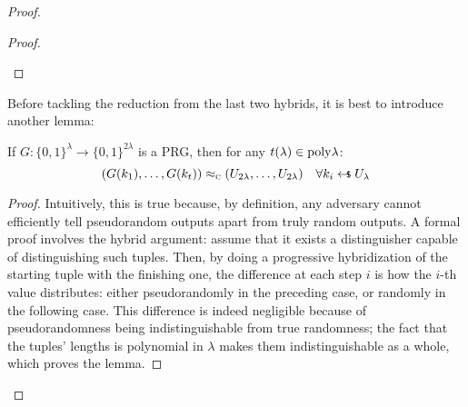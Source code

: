 \begin{proof}
\begin{proof}
\begin{cryptoredux}






        \end{cryptoredux}

    \end{proof}

    Before tackling the reduction from the last two hybrids, it is best to introduce another lemma:


    \begin{lemma}
        If $G : \{0, 1\}^\lambda \to \{0, 1\}^{2\lambda}$ is a PRG, then for any $t(\lambda) \in \mathrm{poly}{\lambda}$:
        \[
            (G(k_1), \dots , G(k_t)) \compindist (U_{2\lambda}, \dots , U_{2\lambda}) \quad \forall k_i \pickUAR U_\lambda
        \]
    \end{lemma}

    \begin{proof}
        Intuitively, this is true because, by \prg{} definition, any \ppt{} adversary cannot efficiently tell pseudorandom outputs apart from truly random outputs. A formal proof involves the hybrid argument: assume that it exists a distinguisher \distinguisher{} capable of distinguishing such tuples. Then, by doing a progressive hybridization of the starting tuple with the finishing one, the difference at each step $i$ is how the $i$-th value distributes: either pseudorandomly in the preceding case, or randomly in the following case. This difference is indeed negligible because of pseudorandomness being indistinguishable from true randomness; the fact that the tuples' lengths is polynomial in $\lambda$ makes them indistinguishable as a whole, which proves the lemma.
    \end{proof}


\end{proof}

